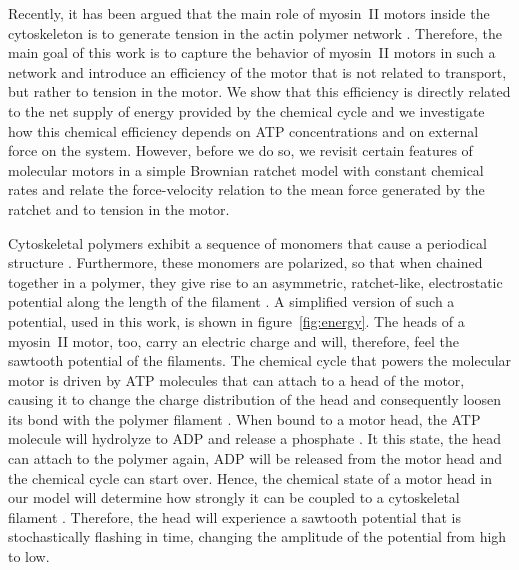 \documentclass[aps,pre,twocolumn,showpacs,showkeys,superscriptaddress,floatfix]{revtex4-1}
\begin{document}
Recently, it has been argued that the main role of myosin~II motors inside the cytoskeleton is to generate tension in the actin polymer network \cite{ma2012nonmuscle,chugh2017actin,monier2010actomyosin}.
Therefore, the main goal of this work is to capture the behavior of myosin~II motors in such a network 
and introduce an efficiency of the motor that is not related to transport, but rather to tension in the motor.
We show that this efficiency is directly related to the net supply of energy provided by the chemical cycle 
and we investigate how this chemical efficiency depends on ATP concentrations and on external force on the system.
However, before we do so, we revisit certain features of molecular motors in a simple Brownian ratchet model \cite{reimann2002brownian} with constant chemical rates and relate the force-velocity relation to the mean force generated by the ratchet and to tension in the motor.

Cytoskeletal polymers exhibit a sequence of monomers that cause a periodical structure \cite{yogurtcu2012mechanochemical}. 
Furthermore, these monomers are polarized, so that when chained together in a polymer, they give rise to an asymmetric, ratchet-like, electrostatic potential along the length of the filament \cite{Nie2014,nie2014conformational}. 
A simplified version of such a potential, used in this work, is shown in figure~\ref{fig:energy}. 
The heads of a myosin~II motor, too, carry an electric charge \cite{barterls1993myosin} and will, therefore, feel the sawtooth potential of the filaments.
The chemical cycle that powers the molecular motor is driven by ATP molecules that can attach to a head of the motor, causing it to change the charge distribution of the head and consequently loosen its bond with the polymer filament \cite{adelstein1980regulation}. 
When bound to a motor head, the ATP molecule will hydrolyze to ADP and release a phosphate \cite{gajewski1986thermodynamics}. 
It this state, the head can attach to the polymer again, ADP will be released from the motor head and the chemical cycle can start over. 
Hence, the chemical state of a motor head in our model will determine how strongly it can be coupled to a cytoskeletal filament \cite{Nie2014,nie2014conformational}. 
Therefore, the head will experience a sawtooth potential that is stochastically flashing in time, changing the amplitude of the potential from high to low.
\end{document}

